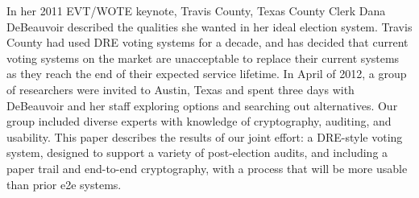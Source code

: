 In her 2011 EVT/WOTE keynote, Travis County, Texas County Clerk Dana DeBeauvoir described the qualities she wanted in her ideal election system. Travis County had used DRE voting systems for a decade, and has decided that current voting systems on the market are unacceptable to replace their current systems as they reach the end of their expected service lifetime. In April of 2012, a group of researchers were invited to Austin, Texas and spent three days with   DeBeauvoir and her staff exploring options and searching out alternatives. Our group included diverse experts with knowledge of cryptography, auditing, and usability. This paper describes the results of our joint effort: a DRE-style voting system, designed to support a variety of post-election audits, and including a paper trail and end-to-end cryptography, with a process that will be more usable than prior e2e systems.
